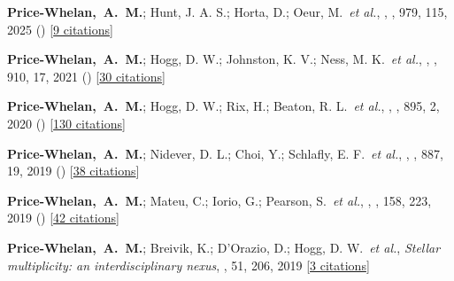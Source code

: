 \item[{\color{deemph}\scriptsize20}]\textbf{Price-Whelan,~A.~M.}; Hunt, J. A. S.; Horta, D.; Oeur, M.~\textit{et al.}, , \apj, 979, 115, 2025 () [\href{http://adsabs.harvard.edu/abs/2025ApJ...979..115P}{9 citations}]

\item[{\color{deemph}\scriptsize19}]\textbf{Price-Whelan,~A.~M.}; Hogg, D. W.; Johnston, K. V.; Ness, M. K.~\textit{et al.}, , \apj, 910, 17, 2021 () [\href{http://adsabs.harvard.edu/abs/2021ApJ...910...17P}{30 citations}]

\item[{\color{deemph}\scriptsize18}]\textbf{Price-Whelan,~A.~M.}; Hogg, D. W.; Rix, H.; Beaton, R. L.~\textit{et al.}, , \apj, 895, 2, 2020 () [\href{http://adsabs.harvard.edu/abs/2020ApJ...895....2P}{130 citations}]

\item[{\color{deemph}\scriptsize17}]\textbf{Price-Whelan,~A.~M.}; Nidever, D. L.; Choi, Y.; Schlafly, E. F.~\textit{et al.}, , \apj, 887, 19, 2019 () [\href{http://adsabs.harvard.edu/abs/2019ApJ...887...19P}{38 citations}]

\item[{\color{deemph}\scriptsize16}]\textbf{Price-Whelan,~A.~M.}; Mateu, C.; Iorio, G.; Pearson, S.~\textit{et al.}, , \aj, 158, 223, 2019 () [\href{http://adsabs.harvard.edu/abs/2019AJ....158..223P}{42 citations}]

\item[{\color{deemph}\scriptsize15}]\textbf{Price-Whelan,~A.~M.}; Breivik, K.; D'Orazio, D.; Hogg, D. W.~\textit{et al.}, \textit{Stellar multiplicity: an interdisciplinary nexus}, \baas, 51, 206, 2019 [\href{http://adsabs.harvard.edu/abs/2019BAAS...51c.206P}{3 citations}]

